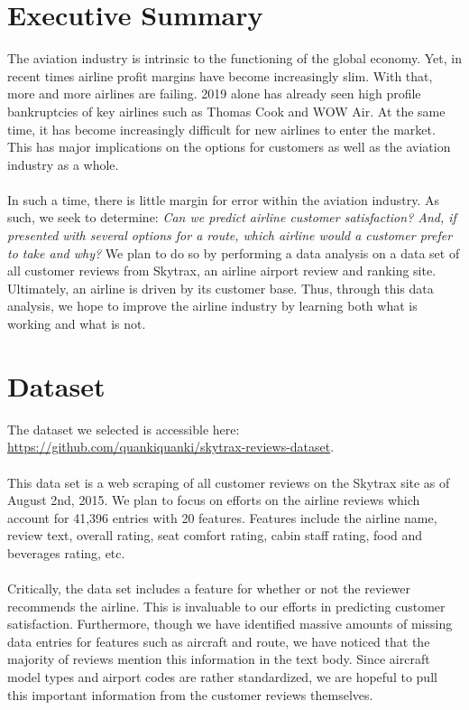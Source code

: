 \documentclass[letterpaper,11pt]{texMemo} %
\begin{document}
\maketitle %
\section{Executive Summary}
The aviation industry is intrinsic to the functioning of the global economy. Yet, in recent times airline profit margins have become increasingly slim. With that, more and more airlines are failing. 2019 alone has already seen high profile bankruptcies of key airlines such as Thomas Cook and WOW Air. At the same time, it has become increasingly difficult for new airlines to enter the market. This has major implications on the options for customers as well as the aviation industry as a whole.\\
\\
\noindent In such a time, there is little margin for error within the aviation industry. As such, we seek to determine: \textit{Can we predict airline customer satisfaction? And, if presented with several options for a route, which airline would a customer prefer to take and why?} We plan to do so by performing a data analysis on a data set of all customer reviews from Skytrax, an airline airport review and ranking site. Ultimately, an airline is driven by its customer base. Thus, through this data analysis, we hope to improve the airline industry by learning both what is working and what is not.

\section{Dataset}
The dataset we selected is accessible here:\\ \url{https://github.com/quankiquanki/skytrax-reviews-dataset}.\\
\\
\noindent This data set is a web scraping of all customer reviews on the Skytrax site as of August 2nd, 2015. We plan to focus on efforts on the airline reviews which account for 41,396 entries with 20 features. Features include the airline name, review text, overall rating, seat comfort rating, cabin staff rating, food and beverages rating, etc.\\
\\
\noindent Critically, the data set includes a feature for whether or not the reviewer recommends the airline. This is invaluable to our efforts in predicting customer satisfaction. Furthermore, though we have identified massive amounts of missing data entries for features such as aircraft and route, we have noticed that the majority of reviews mention this information in the text body. Since aircraft model types and airport codes are rather standardized, we are hopeful to pull this important information from the customer reviews themselves.
\end{document}
